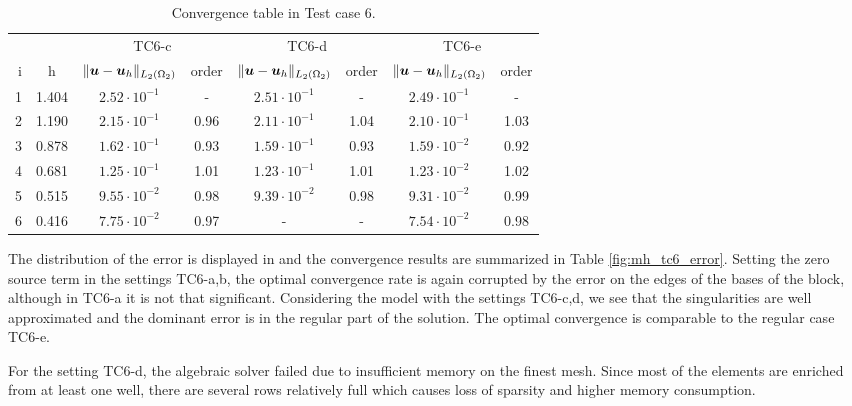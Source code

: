 \begin{table}[!htb]
\begin{center}
\bgroup
\def\arraystretch{1.2}
\setlength\tabcolsep{5pt}
\begin{tabular}{rc|cc|cc|cc}
\toprule
\multicolumn{2}{c|}{} & \multicolumn{2}{c|}{ TC6-c } & \multicolumn{2}{c|}{ TC6-d } & \multicolumn{2}{c}{TC6-e}\\ [3pt] %
i & h & $\|\mathbf{\boldsymbol{u}}-\mathbf{\boldsymbol{u}}_h\|_{L_2(\Omega_2)}$ & order & $\|\mathbf{\boldsymbol{u}}-\mathbf{\boldsymbol{u}}_h\|_{L_2(\Omega_2)}$
    & order & $\|\mathbf{\boldsymbol{u}}-\mathbf{\boldsymbol{u}}_h\|_{L_2(\Omega_2)}$ & order \\ [3pt] \midrule
1 & 1.404 &  $2.52\cdot10^{-1}$  &  -   & $2.51\cdot10^{-1}$ &  -   &  $2.49\cdot10^{-1}$ &   -   \\
2 & 1.190 &  $2.15\cdot10^{-1}$  & 0.96 & $2.11\cdot10^{-1}$ & 1.04 &  $2.10\cdot10^{-1}$ &  1.03 \\
3 & 0.878 &  $1.62\cdot10^{-1}$  & 0.93 & $1.59\cdot10^{-1}$ & 0.93 &  $1.59\cdot10^{-2}$ &  0.92 \\
4 & 0.681 &  $1.25\cdot10^{-1}$  & 1.01 & $1.23\cdot10^{-1}$ & 1.01 &  $1.23\cdot10^{-2}$ &  1.02 \\
5 & 0.515 &  $9.55\cdot10^{-2}$  & 0.98 & $9.39\cdot10^{-2}$ & 0.98 &  $9.31\cdot10^{-2}$ &  0.99 \\
6 & 0.416 &  $7.75\cdot10^{-2}$  & 0.97 &   -                & -    &  $7.54\cdot10^{-2}$ &  0.98 \\
\bottomrule
\end{tabular}
\caption{Convergence table in Test case 6.}
\label{tab:mh_tc6_convergence}
\egroup
\end{center}
\end{table}

The distribution of the error is displayed in 
and the convergence results are summarized in Table \ref{fig:mh_tc6_error}.
Setting the zero source term in the settings TC6-a,b, the optimal convergence rate is again corrupted
by the error on the edges of the bases of the block, although in TC6-a it is not that significant.
Considering the model with the settings TC6-c,d, we see that the singularities are well approximated
and the dominant error is in the regular part of the solution.
The optimal convergence is comparable to the regular case TC6-e.

For the setting TC6-d, the algebraic solver failed due to insufficient memory on the finest mesh. Since most of the elements
are enriched from at least one well, there are several rows relatively full which causes loss of sparsity and higher memory consumption.


